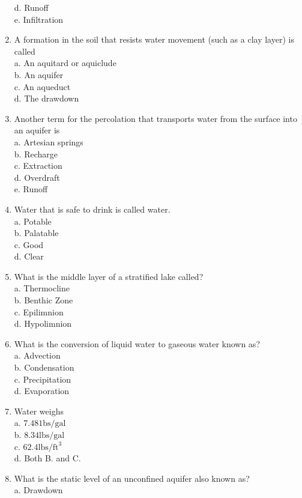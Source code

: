 \begin{enumerate}
d. Runoff\\
e. Infiltration\\
\item A formation in the soil that resists water movement (such as a clay layer) is called\\
a. An aquitard or aquiclude\\
b. An aquifer\\
c. An aqueduct\\
d. The drawdown\\
\item Another term for the percolation that transports water from the surface into an aquifer is\\
a. Artesian springs\\
b. Recharge\\
c. Extraction\\
d. Overdraft\\
e. Runoff\\
\item Water that is safe to drink is called water.\\
a. Potable\\
b. Palatable\\
c. Good\\
d. Clear\\
\item What is the middle layer of a stratified lake called?\\
a. Thermocline\\
b. Benthic Zone\\
c. Epilimnion\\
d. Hypolimnion\\
\item What is the conversion of liquid water to gaseous water known as?\\
a. Advection\\
b. Condensation\\
c. Precipitation\\
d. Evaporation\\
\item Water weighs\\
a. $7.481 \mathrm{bs} / \mathrm{gal}$\\
b. $8.34 \mathrm{lbs} / \mathrm{gal}$\\
c. $62.4 \mathrm{lbs} / \mathrm{ft}^{3}$\\
d. Both B. and C.
\item What is the static level of an unconfined aquifer also known as?\\
a. Drawdown\\

\end{enumerate}
